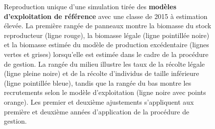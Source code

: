 \documentclass[11pt]{book}
\begin{document}
\newpage
\begin{turn}

\begin{figure}[htb]

{\centering {} 

}

\caption{Reproduction unique d’une simulation tirée des \textbf{modèles d’exploitation de référence} avec une classe de 2015 à estimation élevée. La première rangée de panneaux montre la biomasse du stock reproducteur (ligne rouge), la biomasse légale (ligne pointillée noire) et la biomasse estimée du modèle de production excédentaire (lignes vertes et grises) lorsqu’elle est estimée dans le cadre de la procédure de gestion. La rangée du milieu illustre les taux de la récolte légale (ligne pleine noire) et de la récolte d’individus de taille inférieure (ligne pointillée bleue), tandis que la rangée du bas montre les recrutements selon le modèle d’exploitation (ligne noire avec points orange). Les premier et deuxième ajustements s’appliquent aux première et deuxième années d’application de la procédure de gestion.}\label{fig:unnamed-chunk-22}
\end{figure}
\newpage


\begin{figure}[htb]

{\centering {} 

}
\end{figure}
\end{turn}
\end{document}
